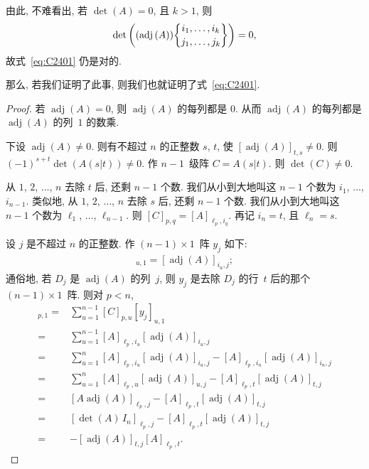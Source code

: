 \documentclass[../libro.tex]{subfiles}
\begin{document}
由此, 不难看出, 若 \(\det {(A)} = 0\),
且 \(k > 1\), 则
\begin{align*}
    \det {\left(
            (\operatorname{adj} {(A)})
            \submat{i_1,\dots,i_k}{j_1,\dots,j_k}
    \right)} = 0,
\end{align*}
故式~\eqref{eq:C2401} 仍是对的.

那么, 若我们证明了此事, 则我们也就证明了式~\eqref{eq:C2401}.

\begin{proof}
    若 \(\operatorname{adj} {(A)} = 0\),
    则 \(\operatorname{adj} {(A)}\) 的每列都是 \(0\).
    从而 \(\operatorname{adj} {(A)}\)
    的每列都是
    \(\operatorname{adj} {(A)}\) 的列~\(1\) 的数乘.

    下设 \(\operatorname{adj} {(A)} \neq 0\).
    则有不超过 \(n\) 的正整数 \(s\), \(t\),
    使 \([\operatorname{adj} {(A)}]_{t,s} \neq 0\).
    则 \((-1)^{s+t} \det {(A(s|t))} \neq 0\).
    作 \(n-1\)~级阵 \(C = A(s|t)\).
    则 \(\det {(C)} \neq 0\).

    从 \(1\), \(2\), \(\dots\), \(n\)
    去除 \(t\) 后, 还剩 \(n - 1\) 个数.
    我们从小到大地叫这 \(n - 1\) 个数为
    \(i_1\), \(\dots\), \(i_{n-1}\).
    类似地, 从 \(1\), \(2\), \(\dots\), \(n\)
    去除 \(s\) 后, 还剩 \(n - 1\) 个数.
    我们从小到大地叫这 \(n - 1\) 个数为
    \(\ell_1\), \(\dots\), \(\ell_{n-1}\).
    则 \([C]_{p,q} = [A]_{\ell_p,i_q}\).
    再记 \(i_n = t\), 且 \(\ell_n = s\).

    设 \(j\) 是不超过 \(n\) 的正整数.
    作 \((n-1) \times 1\)~阵 \(y_j\) 如下:
    \begin{align*}
        [y_j]_{u,1} = [\operatorname{adj} {(A)}]_{i_u,j};
    \end{align*}
    通俗地, 若 \(D_j\) 是
    \(\operatorname{adj} {(A)}\) 的列~\(j\),
    则 \(y_j\) 是去除 \(D_j\) 的行~\(t\) 后的那个
    \((n-1) \times 1\)~阵.
    则对 \(p < n\),
    \begin{align*}
        [C y_j]_{p,1}
        = {} &
        \sum_{u=1}^{n-1} {[C]_{p,u} [y_j]_{u,1}}
        \\
        = {} &
        \sum_{u=1}^{n-1}
        {[A]_{\ell_p,i_u} [\operatorname{adj} {(A)}]_{i_u,j}}
        \\
        = {} &
        \sum_{u=1}^{n}
        {[A]_{\ell_p,i_u} [\operatorname{adj} {(A)}]_{i_u,j}}
        - [A]_{\ell_p,i_n} [\operatorname{adj} {(A)}]_{i_n,j}
        \\
        = {} &
        \sum_{u=1}^{n}
        {[A]_{\ell_p,u} [\operatorname{adj} {(A)}]_{u,j}}
        - [A]_{\ell_p,t} [\operatorname{adj} {(A)}]_{t,j}
        \\
        = {} &
        [A \operatorname{adj} {(A)}]_{\ell_p,j}
        - [A]_{\ell_p,t} [\operatorname{adj} {(A)}]_{t,j}
        \\
        = {} &
        [\det {(A)}\, I_n]_{\ell_p,j}
        - [A]_{\ell_p,t} [\operatorname{adj} {(A)}]_{t,j}
        \\
        = {} &
        {-} [\operatorname{adj} {(A)}]_{t,j} [A]_{\ell_p,t}.
    \end{align*}


\end{proof}
\end{document}
